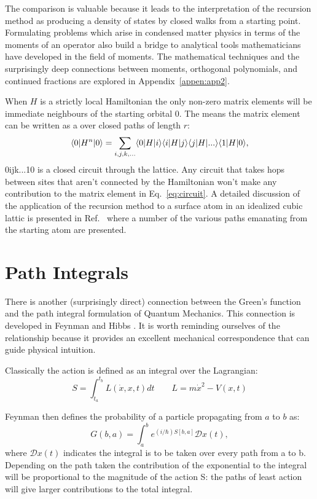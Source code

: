 The comparison is valuable because it leads to the interpretation of 
the recursion method as producing a density of states by closed walks
from a starting point\cite{ducastelle70}. Formulating problems
which arise in condensed matter physics in terms of the moments of
an operator also build a bridge to analytical tools mathematicians
have developed in the field of moments. The mathematical techniques
and the surprisingly deep connections between moments, orthogonal
polynomials, and continued fractions are explored in Appendix~\ref{appen:app2}.

When $H$ is a strictly local Hamiltonian the only non-zero matrix elements 
will be immediate neighbours of the starting orbital $0$. The means
the matrix element can be written as a over closed paths of length $r$:
%
\begin{equation}
\label{eq:circuit}
\langle 0|H^{n}|0 \rangle = \sum_{i,j,k,...}\langle 0|H|i\rangle\langle i|H|j\rangle\langle j|H|...\rangle\langle 1|H|0\rangle,
\end{equation}
%
0ijk...10 is a closed circuit through the lattice. Any circuit that takes hops between sites 
that aren't connected by the Hamiltonian won't make any contribution to the matrix element
in Eq.~\ref{eq:circuit}. A detailed discussion of the application of the recursion method 
to a surface atom in an idealized cubic lattic is presented in Ref.~\cite{haydock75} 
where a number of the various paths emanating from the starting atom are presented. 

\section{Path Integrals}
There is another (surprisingly direct) connection between the Green's function and 
the path integral formulation of Quantum Mechanics.
This connection is developed in Feynman and Hibbs \cite{feynmanhibbs64}. It is worth
reminding ourselves of the relationship because it provides an excellent mechanical
correspondence that can guide physical intuition.

Classically the action is defined as an integral over the Lagrangian:
%
\begin{equation}
S=\int_{t_{a}}^{t_b} L(\dot{x}, x,t) dt \qquad L = m\dot{x}^{2}-V(x,t)
\end{equation}
%

Feynman then defines the probability of a particle propagating from $a$ to $b$ as:
%
\begin{equation}
G(b,a) = \int_{a}^{b} e^{(i/\hbar)S[b,a]} \mathcal{D}x(t),
\end{equation}
%
where $\mathcal{D}x(t)$ indicates the integral is to be taken over every path from a to b.
Depending on the path taken the contribution of the exponential to the integral will be proportional
to the magnitude of the action S: the paths of least action will give larger contributions 
to the total integral.

